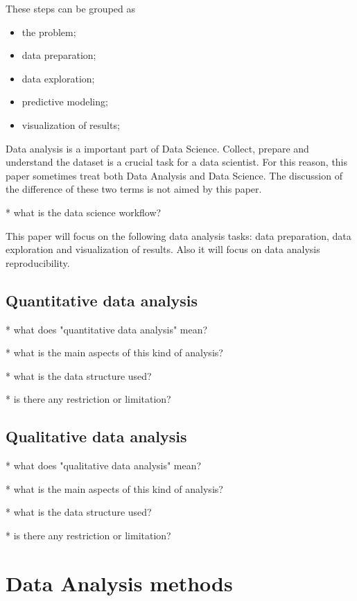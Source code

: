 \documentclass[12pt,a4paper]{amsart}
\numberwithin{equation}{section}
\theoremstyle{plain}
\theoremstyle{definition}
\begin{document}
These steps can be grouped as \cite{cuesta2016practical}

\begin{itemize}
\item the problem;
\item data preparation;
\item data exploration;
\item predictive modeling;
\item visualization of results;
\end{itemize}

Data analysis is a important part of Data Science. Collect, prepare and understand the dataset is a crucial task for a data scientist. For this reason, this paper sometimes treat both Data Analysis and Data Science. The discussion of the difference of these two terms is not aimed by this paper.

* what is the data science workflow?

This paper will focus on the following data analysis tasks: data preparation, data exploration and visualization of results. Also it will focus on data analysis reproducibility.

\subsection{Quantitative data analysis}\label{quantitative-analysis}

* what does "quantitative data analysis" mean?

* what is the main aspects of this kind of analysis?

* what is the data structure used?

* is there any restriction or limitation?

\subsection{Qualitative data analysis}\label{qualitative-analysis}

* what does "qualitative data analysis" mean?

* what is the main aspects of this kind of analysis?

* what is the data structure used?

* is there any restriction or limitation?


\section{Data Analysis methods}\label{methods}
\end{document}
